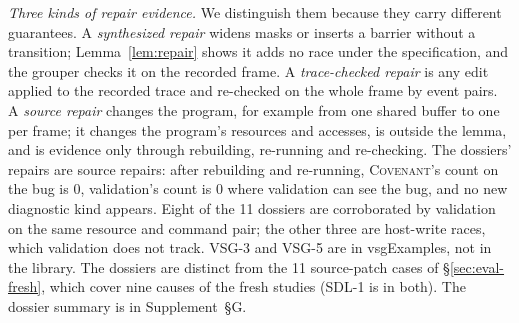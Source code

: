 \documentclass[acmtog,anonymous,review]{acmart}
\newcommand{\sys}{\textsc{Covenant}\xspace}
\newcommand{\supp}[1]{Supplement~\S#1}
\begin{document}
\emph{Three kinds of repair evidence.} We distinguish them because they carry different guarantees. A
\emph{synthesized repair} widens masks or inserts a barrier without a transition; Lemma~\ref{lem:repair} shows it adds
no race under the specification, and the grouper checks it on the recorded frame. A \emph{trace-checked repair} is
any edit applied to the recorded trace and re-checked on the whole frame by event pairs. A \emph{source repair}
changes the program, for example from one shared buffer to one per frame; it changes the program's resources and
accesses, is outside the lemma, and is evidence only through rebuilding, re-running and re-checking. The dossiers'
repairs are source repairs: after rebuilding and re-running, \sys's count on the bug is 0, validation's count is 0
where validation can see the bug, and no new diagnostic kind appears. Eight of the 11 dossiers are corroborated by
validation on the same resource and command pair; the other three are host-write races, which validation does not
track. VSG-3 and VSG-5 are in vsgExamples, not in the library. The dossiers are distinct from the 11 source-patch cases
of \S\ref{sec:eval-fresh}, which cover nine causes of the fresh studies (SDL-1 is in both). The dossier summary is in
\supp{G}.
\end{document}
